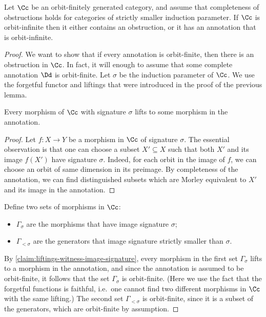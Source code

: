 \begin{lemma}\label{lem:there-must-be-an-obstruction-or-annotation}
        Let $\Cc$ be an orbit-finitely generated category, and assume that completeness of obstructions holds for categories of strictly smaller  induction parameter. 
 If $\Cc$ is orbit-infinite then it either  contains an obstruction, or it has an annotation that is orbit-infinite. 
\end{lemma}
\begin{proof}
    We want to show that if every annotation is orbit-finite, then there is an obstruction in $\Cc$. 
    In fact, it will enough to assume that some complete annotation $\Dd$ is orbit-finite.  Let $\sigma$ be the induction parameter of $\Cc$. We use the forgetful functor and liftings that were introduced in the proof of the previous lemma. 

    \begin{claim}\label{claim:liftings-witness-image-signature}
    Every morphism of $\Cc$ with signature $\sigma$ lifts to some morphism in the annotation. 
\end{claim}
\begin{proof}
Let $f : X \to Y$ be a morphism in $\Cc$ of signature $\sigma$. The essential observation is that one  can choose a subset $X' \subseteq X$  such that both $X'$ and its image $f(X')$ have signature $\sigma$. 
Indeed, for  each orbit in the image of $f$, we can  choose an orbit of same dimension in its preimage. By completeness of the annotation, we can find distinguished subsets which are Morley equivalent to $X'$ and its image in the annotation.
\end{proof}

    Define two sets of morphisms in $\Cc$:
    \begin{itemize}
        \item $\Gamma_{\sigma}$ are the morphisms that have  image signature $\sigma$;
        \item $\Gamma_{<\sigma}$ are the  generators that image signature strictly smaller than $\sigma$.
    \end{itemize}

By \cref{claim:liftings-witness-image-signature}, every morphism in the first set $\Gamma_\sigma$ lifts to a morphism in the annotation, and since the annotation is assumed to be orbit-finite, it follows that the set $\Gamma_\sigma$ is orbit-finite. (Here we use the fact that the forgetful functions is faithful, i.e.~one cannot find two different morphisms in $\Cc$ with the same lifting.) The second set $\Gamma_{<\sigma}$ is orbit-finite, since it is a subset of the generators, which are orbit-finite by assumption.



\end{proof}
